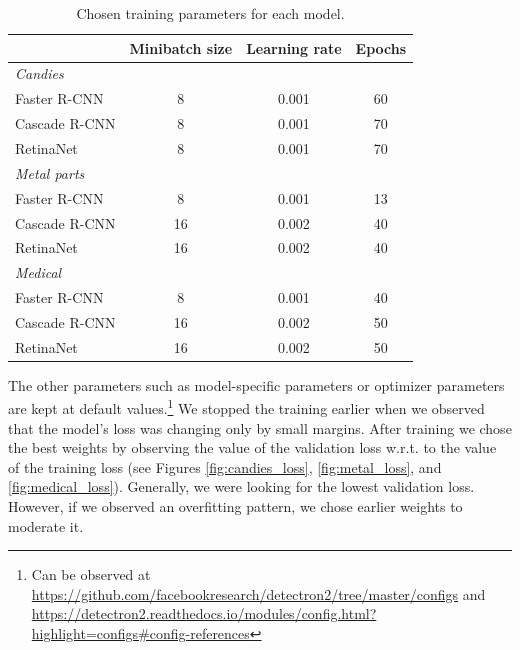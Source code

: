 \begin{table}[h]
	\centering
	\begin{tabular}{l|c|c|c}
		                            & Minibatch size & Learning rate & Epochs \\
		\hline
		\textit{Candies}            &                &               &        \\
		\hspace{0.1cm}Faster R-CNN  & 8              & 0.001         & 60     \\
		\hspace{0.1cm}Cascade R-CNN & 8              & 0.001         & 70     \\
		\hspace{0.1cm}RetinaNet     & 8              & 0.001         & 70     \\
		\hline
		\textit{Metal parts}        &                &               &        \\
		\hspace{0.1cm}Faster R-CNN  & 8              & 0.001         & 13     \\
		\hspace{0.1cm}Cascade R-CNN & 16             & 0.002         & 40     \\
		\hspace{0.1cm}RetinaNet     & 16             & 0.002         & 40     \\
		\hline
		\textit{Medical}            &                &               &        \\
		\hspace{0.1cm}Faster R-CNN  & 8              & 0.001         & 40     \\
		\hspace{0.1cm}Cascade R-CNN & 16             & 0.002         & 50     \\
		\hspace{0.1cm}RetinaNet     & 16             & 0.002         & 50
	\end{tabular}
	\caption{Chosen training parameters for each model.}
	\label{tab:parameters}
\end{table}
The other parameters such as model-specific parameters or optimizer parameters
are kept at default values.\footnote{Can be observed at
	\url{https://github.com/facebookresearch/detectron2/tree/master/configs} and \\
	\url{https://detectron2.readthedocs.io/modules/config.html?highlight=configs\#config-references}}
We stopped the training earlier when we observed that the model's loss was
changing only by small margins. After training we chose the best weights by
observing the value of the validation loss w.r.t. to the value of the training
loss (see Figures \ref{fig:candies_loss}, \ref{fig:metal_loss}, and
\ref{fig:medical_loss}). Generally, we were looking for the lowest validation
loss. However, if we observed an overfitting pattern, we chose earlier weights
to moderate it.
